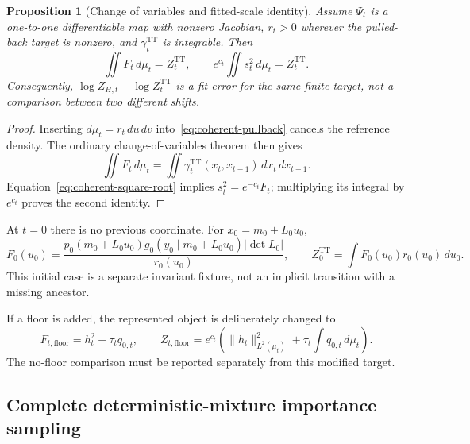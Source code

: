 \documentclass[11pt]{article}
\newtheorem{proposition}{Proposition}
\begin{document}
\begin{proposition}[Change of variables and fitted-scale identity]
\label{prop:coherent-pullback}
Assume $\Psi_t$ is a one-to-one differentiable map with nonzero Jacobian,
$r_t>0$ wherever the pulled-back target is nonzero, and
$\gamma_t^{\mathrm{TT}}$ is integrable. Then
\begin{equation}\label{eq:coherent-pullback-integral}
  \iint F_t\,d\mu_t=Z_t^{\mathrm{TT}},
  \qquad
  e^{c_t}\iint s_t^2\,d\mu_t=Z_t^{\mathrm{TT}}.
\end{equation}
Consequently, $\log Z_{H,t}-\log Z_t^{\mathrm{TT}}$ is a fit error for the
same finite target, not a comparison between two different shifts.
\end{proposition}

\begin{proof}
Inserting $d\mu_t=r_t\,du\,dv$ into~\eqref{eq:coherent-pullback} cancels the
reference density. The ordinary change-of-variables theorem then gives
\[
\iint F_t\,d\mu_t
 =\iint\gamma_t^{\mathrm{TT}}(x_t,x_{t-1})\,dx_t\,dx_{t-1}.
\]
Equation~\eqref{eq:coherent-square-root} implies $s_t^2=e^{-c_t}F_t$;
multiplying its integral by $e^{c_t}$ proves the second identity.
\end{proof}

At $t=0$ there is no previous coordinate. For $x_0=m_0+L_0u_0$,
\begin{equation}\label{eq:coherent-initial-pullback}
  F_0(u_0)=
  \frac{p_0(m_0+L_0u_0)g_0(y_0\mid m_0+L_0u_0)|\det L_0|}{r_0(u_0)},
  \qquad Z_0^{\mathrm{TT}}=\int F_0(u_0)r_0(u_0)\,du_0.
\end{equation}
This initial case is a separate invariant fixture, not an implicit transition
with a missing ancestor.

If a floor is added, the represented object is deliberately changed to
\begin{equation}\label{eq:coherent-floor-normalizer}
  F_{t,\mathrm{floor}}=h_t^2+\tau_tq_{0,t},
  \qquad
  Z_{t,\mathrm{floor}}=e^{c_t}\left(\|h_t\|_{L^2(\mu_t)}^2
        +\tau_t\int q_{0,t}\,d\mu_t\right).
\end{equation}
The no-floor comparison must be reported separately from this modified target.

\subsection{Complete deterministic-mixture importance sampling}
\end{document}

